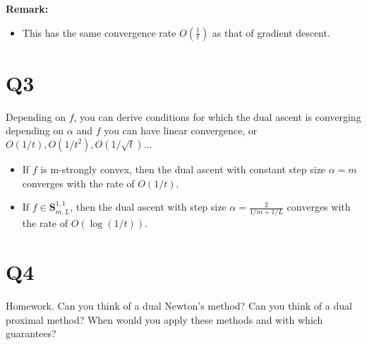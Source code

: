 \documentclass[12pt]{article}
\theoremstyle{mystyle}
\begin{document}
\textbf{Remark:} 
\begin{itemize}
    \item This has the same convergence rate $O(\frac{1}{t})$ as that of gradient descent.
\end{itemize}

\section{Q3}
Depending on $f$, you can derive conditions for which the dual ascent is converging depending on $\alpha$ and $f$ you can have linear convergence, or $O(1 / t), O\left(1 / t^2\right), O(1 / \sqrt{t}) \ldots$
\begin{itemize}
    \item If $f$ is m-strongly convex, then the dual ascent with constant step size $\alpha = m$ converges with the rate of $O(1/t)$.
    \item If $f \in \mathbf{S}^{1,1}_{m,L}$, then the dual ascent with step size $\alpha = \frac{2}{1/m + 1/L}$ converges with the rate of $O(\log (1/t))$.
\end{itemize}
\section{Q4}
Homework. Can you think of a dual Newton’s method? Can you think of a
dual proximal method? When would you apply these methods and with
which guarantees?
\end{document}
